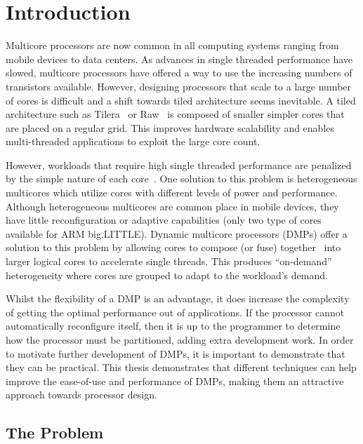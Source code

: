 \chapter{Introduction}
Multicore processors are now common in all computing systems ranging from mobile devices to data centers.
As advances in single threaded performance have slowed, multicore processors have offered a way to use the increasing numbers of transistors available.
However, designing processors that scale to a large number of cores is difficult and a shift towards tiled architecture seems inevitable.
A tiled architecture such as Tilera~\cite{bell2008tile} or Raw~\cite{waingold1997raw} is composed of smaller simpler cores that are placed on a regular grid.
This improves hardware scalability and enables multi-threaded applications to exploit the large core count.

However, workloads that require high single threaded performance are penalized by the simple nature of each core~\cite{eyerman2010amdahl}.
One solution to this problem is heterogeneous multicores which utilize cores with different levels of power and performance.
Although heterogeneous multicores are common place in mobile devices, they have little reconfiguration or adaptive capabilities (\eg only two type of cores available for ARM big.LITTLE).
Dynamic multicore processors (DMPs) offer a solution to this problem by allowing cores to compose (or fuse) together~\cite{ipek2007CoreFusion} into larger logical cores to accelerate single threads.
This produces ``on-demand'' heterogeneity where cores are grouped to adapt to the workload's demand.

Whilst the flexibility of a DMP is an advantage, it does increase the complexity of getting the optimal performance out of applications.
If the processor cannot automatically reconfigure itself, then it is up to the programmer to determine how the processor must be partitioned, adding extra development work.
In order to motivate further development of DMPs, it is important to demonstrate that they can be practical.
This thesis demonstrates that different techniques can help improve the ease-of-use and performance of DMPs, making them an attractive approach towards processor design. 

\section{The Problem}

